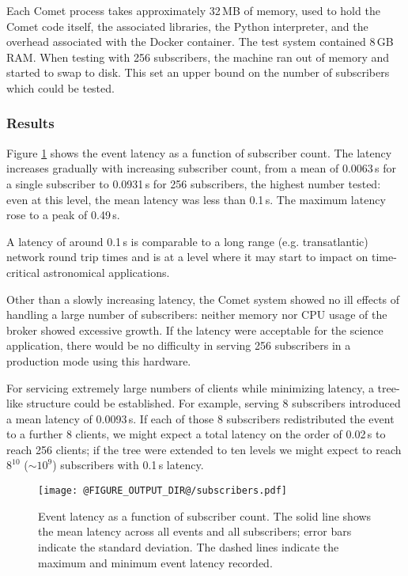 \documentclass[5p,authoryear]{elsarticle}
\begin{document}
Each Comet process takes approximately 32\,MB of memory, used to hold the
Comet code itself, the associated libraries, the Python interpreter, and the
overhead associated with the Docker container. The test system contained 8\,GB
RAM. When testing with 256 subscribers, the machine ran out of memory and
started to swap to disk. This set an upper bound on the number of subscribers
which could be tested.

\subsubsection{Results}

Figure \ref{fig:subscribers} shows the event latency as a function of
subscriber count. The latency increases gradually with increasing subscriber
count, from a mean of 0.0063\,s for a single subscriber to 0.0931\,s for 256
subscribers, the highest number tested: even at this level, the mean latency
was less than 0.1\,s. The maximum latency rose to a peak of 0.49\,s.

A latency of around 0.1\,s is comparable to a long range (e.g. transatlantic)
network round trip times and is at a level where it may start to impact on
time-critical astronomical applications.

Other than a slowly increasing latency, the Comet system showed no
ill effects of handling a large number of subscribers: neither memory nor CPU
usage of the broker showed excessive growth. If the latency were acceptable
for the science application, there would be no difficulty in serving 256
subscribers in a production mode using this hardware.

For servicing extremely large numbers of clients while minimizing latency, a
tree-like structure could be established. For example, serving 8 subscribers
introduced a mean latency of 0.0093\,s. If each of those 8 subscribers
redistributed the event to a further 8 clients, we might expect a total
latency on the order of 0.02\,s to reach 256 clients; if the tree were
extended to ten levels we might expect to reach $8^{10}$ ($\sim10^9$)
subscribers with 0.1\,s latency.

\begin{figure}
  \begin{center}
  \texttt{[image: @FIGURE\_OUTPUT\_DIR@/subscribers.pdf]}
  \end{center}

  \caption{Event latency as a function of subscriber count. The solid line
  shows the mean latency across all events and all subscribers; error bars
  indicate the standard deviation. The dashed lines indicate the maximum and
  minimum event latency recorded.}

  \label{fig:subscribers}
\end{figure}
\end{document}
